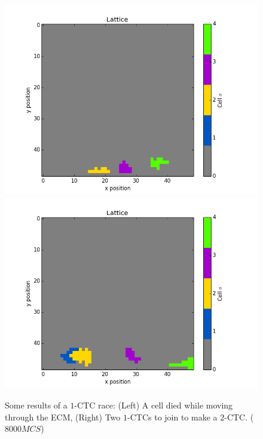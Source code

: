 \documentclass[12pt]{article}
\begin{document}
\begin{figure}[h]
	\centering
	\includegraphics[scale=0.40]{img/1CTC-dead}
	\includegraphics[scale=0.40]{img/1CTC-join}
	\caption{Some results of a $1$-CTC race: (Left) A cell died while moving through the ECM, (Right) Two $1$-CTCs to join to make a $2$-CTC. ($8000MCS$)}
	\label{single_results}
\end{figure}
\end{document}

